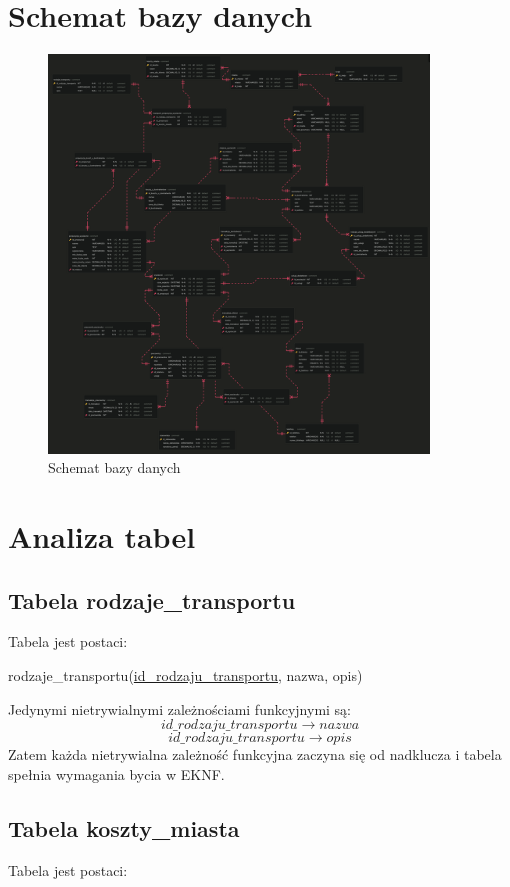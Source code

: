 \documentclass[a4paper,12pt]{mwart}
\begin{document}
\section{Schemat bazy danych}
\begin{figure}[h!]
    \centering
    \includegraphics[width=0.9\textwidth]{baza_danych_fullsize.png}
    \caption{Schemat bazy danych}
\end{figure}
\section{Analiza tabel}
\subsection{Tabela rodzaje\_transportu}
Tabela jest postaci:

rodzaje\_transportu(\underline{id\_rodzaju\_transportu}, nazwa, opis)

\noindent Jedynymi nietrywialnymi zależnościami funkcyjnymi są:
$$   id\_rodzaju\_transportu  \rightarrow nazwa $$
$$   id\_rodzaju\_transportu  \rightarrow opis$$
Zatem każda nietrywialna zależność funkcyjna zaczyna się od nadklucza i tabela  spełnia wymagania bycia w EKNF.

\subsection{Tabela koszty\_miasta}
Tabela jest postaci:
\end{document}

